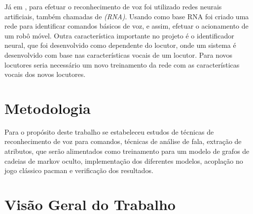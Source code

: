 Já em , para efetuar o reconhecimento de voz foi utilizado redes neurais artificiais, também chamadas de \textit{(RNA)}. Usando como base RNA foi criado uma rede para identificar comandos básicos de voz, e assim, efetuar o acionamento de um robô móvel. Outra característica importante no projeto é o identificador neural, que foi desenvolvido como dependente do locutor, onde um sistema é desenvolvido com base nas características vocais de um locutor. Para novos locutores seria necessário um novo treinamento da rede com as características vocais dos novos locutores.

\section{Metodologia}
Para o propósito deste trabalho se estabeleceu estudos de técnicas de reconhecimento de voz para comandos, técnicas de análise de fala, extração de atributos, que serão alimentados como treinamento para um modelo de grafos de cadeias de markov oculto, implementação dos diferentes modelos, acoplação no jogo clássico pacman e verificação dos resultados. 
\section{Visão Geral do Trabalho}









